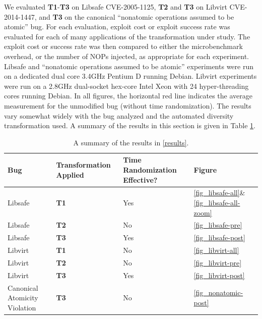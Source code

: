 We evaluated \textbf{T1}-\textbf{T3} on Libsafe CVE-2005-1125, \textbf{T2} and \textbf{T3} on Libvirt CVE-2014-1447, and \textbf{T3} on the canonical ``nonatomic operations assumed to be atomic'' bug.
For each evaluation, exploit cost or exploit success rate was evaluated for each of many applications of the transformation under study.
The exploit cost or success rate was then compared to either the microbenchmark overhead, or the number of NOPs injected, as appropriate for each experiment.
Libsafe and ``nonatomic operations assumed to be atomic'' experiments were run on a dedicated dual core 3.4GHz Pentium D running Debian.
Libvirt experiments were run on a 2.8GHz dual-socket hex-core Intel Xeon with 24 hyper-threading cores running Debian.
In all figures, the horizontal red line indicates the average measurement for the unmodified bug (without time randomization).
The results vary somewhat widely with the bug analyzed and the automated diversity transformation used.
A summary of the results in this section is given in Table \ref{tab_results}.
\begin{table}
	\centering
	\begin{tabular}{ | p{0.6in} | p{0.6in} | p{0.6in} | p{0.6in} | }
	\hline
	Bug & Transfor\-mation Applied & Time Randomization Effective? & Figure \\ \hline
	\hline
	Libsafe & \textbf{T1} & Yes & \ref{fig_libsafe-all}\&\ref{fig_libsafe-all-zoom} \\ \hline
	Libsafe & \textbf{T2} & No & \ref{fig_libsafe-pre} \\ \hline
	Libsafe & \textbf{T3} & Yes & \ref{fig_libsafe-post} \\ \hline
	Libvirt & \textbf{T1} & No & \ref{fig_libvirt-all} \\ \hline
	Libvirt & \textbf{T2} & No & \ref{fig_libvirt-pre} \\ \hline
	Libvirt & \textbf{T3} & Yes & \ref{fig_libvirt-post} \\ \hline
	Canonical Atomicity Violation & \textbf{T3} & No & \ref{fig_nonatomic-post} \\ \hline
	\end{tabular}
	\caption{A summary of the results in \autoref{results}.}
	\label{tab_results}
\end{table}

